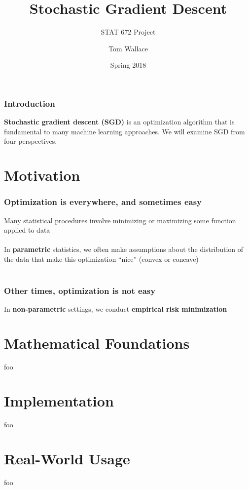 \documentclass{beamer}
\title{Stochastic Gradient Descent}
\subtitle{STAT 672 Project}
\author{Tom Wallace}
\institute{George Mason University}
\date{Spring 2018}
\begin{document}
\frame{\titlepage}

\begin{frame}

\frametitle{Introduction}
\textbf{Stochastic gradient descent (SGD)} is an optimization algorithm that is
fundamental to many machine learning approaches. We will examine SGD from four
perspectives. 

\tableofcontents

\end{frame}

\section{Motivation}
\begin{frame}
\frametitle{Optimization is everywhere, and sometimes easy}
Many statistical procedures involve minimizing or maximizing some function 
applied to data \\~\\

In \textbf{parametric} statistics, we often make assumptions about the
distribution of the data that make this optimization ``nice'' (convex or
concave) \\~\\

\hskip 5pt
\end{frame}

\begin{frame}
\frametitle{Other times, optimization is not easy}
In \textbf{non-parametric} settings, we conduct \textbf{empirical risk
minimization}
\end{frame}

\section{Mathematical Foundations}
\begin{frame}
foo
\end{frame}

\section{Implementation}
\begin{frame}
foo
\end{frame}

\section{Real-World Usage}
\begin{frame}
foo
\end{frame}
\end{document}
